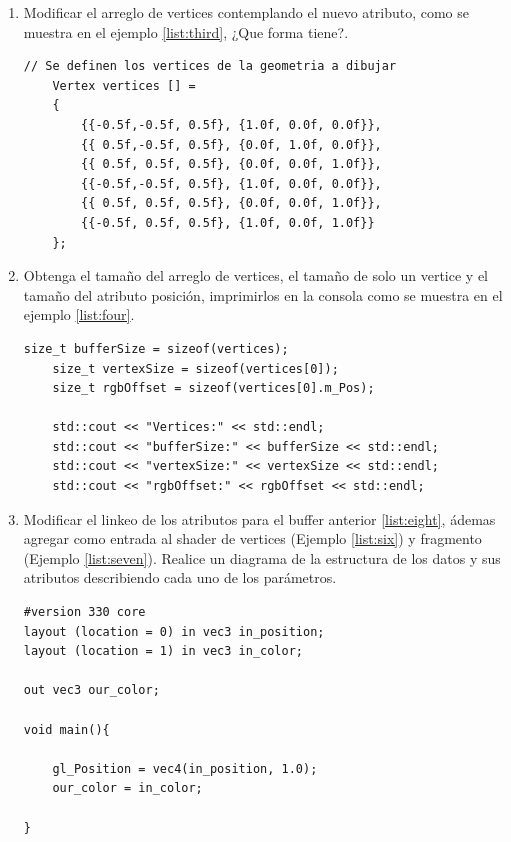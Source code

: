 \documentclass[11pt, english]{article}
\begin{document}
\begin{enumerate}
\item Modificar el arreglo de vertices contemplando el nuevo atributo, como se muestra en el ejemplo \ref{list:third}, ¿Que forma tiene?.

\begin{lstlisting}[label={list:third},caption=Arreglo de vertices., style=customc]
	// Se definen los vertices de la geometria a dibujar
	Vertex vertices [] =
	{
		{{-0.5f,-0.5f, 0.5f}, {1.0f, 0.0f, 0.0f}},
		{{ 0.5f,-0.5f, 0.5f}, {0.0f, 1.0f, 0.0f}},
		{{ 0.5f, 0.5f, 0.5f}, {0.0f, 0.0f, 1.0f}},
		{{-0.5f,-0.5f, 0.5f}, {1.0f, 0.0f, 0.0f}},
		{{ 0.5f, 0.5f, 0.5f}, {0.0f, 0.0f, 1.0f}},
		{{-0.5f, 0.5f, 0.5f}, {1.0f, 0.0f, 1.0f}}
	};
\end{lstlisting}

\item Obtenga el tamaño del arreglo de vertices, el tamaño de solo un vertice y el tamaño del atributo posición, imprimirlos en la consola como se muestra en el ejemplo \ref{list:four}.

\begin{lstlisting}[label={list:four},caption={Tamaño del buffer, vertice y atributo posición.}, style=customc]
	size_t bufferSize = sizeof(vertices);
	size_t vertexSize = sizeof(vertices[0]);
	size_t rgbOffset = sizeof(vertices[0].m_Pos);

	std::cout << "Vertices:" << std::endl;
	std::cout << "bufferSize:" << bufferSize << std::endl;
	std::cout << "vertexSize:" << vertexSize << std::endl;
	std::cout << "rgbOffset:" << rgbOffset << std::endl;
\end{lstlisting}

\item Modificar el linkeo de los atributos para el buffer anterior \ref{list:eight}, ádemas agregar como entrada al shader de vertices (Ejemplo \ref{list:six}) y fragmento (Ejemplo \ref{list:seven}).  Realice un diagrama de la estructura de los datos y sus atributos describiendo cada uno de los parámetros.

\begin{lstlisting}[label={list:six},caption={Vertex Shader.}, style=customc]
#version 330 core
layout (location = 0) in vec3 in_position;
layout (location = 1) in vec3 in_color;

out vec3 our_color;

void main(){

	gl_Position = vec4(in_position, 1.0);
	our_color = in_color;

}

\end{lstlisting}


\end{enumerate}
\end{document}
